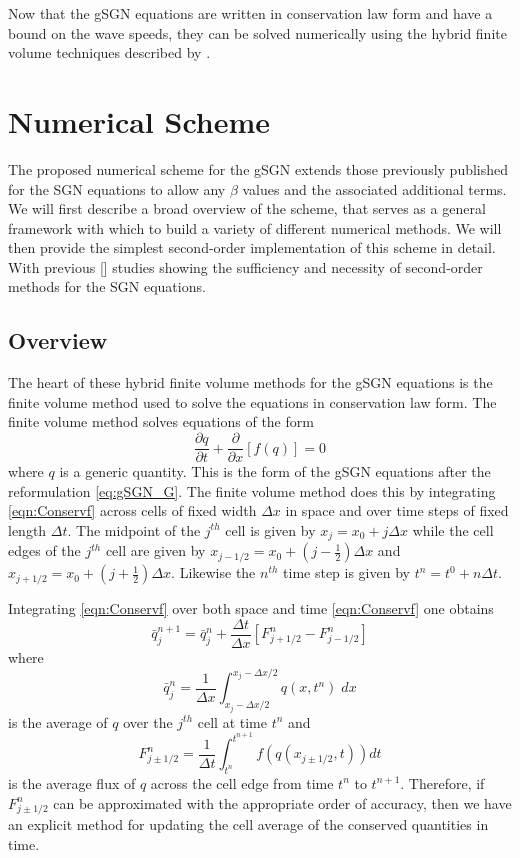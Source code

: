 \documentclass[10pt]{elsarticle}
\begin{document}
Now that the gSGN equations are written in conservation law form and have a bound on the wave speeds, they can be solved numerically using the hybrid finite volume techniques described by \citet{Zoppou-etal-2017}.

\section{Numerical Scheme}
The proposed numerical scheme for the gSGN extends those previously published for the SGN equations \cite{Hank-etal-2010-2034,Zoppou-etal-2017} to allow any $\beta$ values and the associated additional terms. We will first describe a broad overview of the scheme, that serves as a general framework with which to build a variety of different numerical methods. We will then provide the simplest second-order implementation of this scheme in detail. With previous [] studies showing the sufficiency and necessity of second-order methods for the SGN equations. 


\subsection{Overview}
The heart of these hybrid finite volume methods for the gSGN equations is the finite volume method used to solve the equations in conservation law form. The finite volume method solves equations of the form 
\begin{equation}
\label{eqn:Conservf}
\frac{\partial q}{\partial t} + \frac{\partial}{\partial x}\left[f(q)\right] = 0
\end{equation}
where $q$ is a generic quantity. This is the form of the gSGN equations after the reformulation \eqref{eq:gSGN_G}. The finite volume method does this by integrating \eqref{eqn:Conservf} across cells of fixed width $\Delta x$ in space and over time steps of fixed length $\Delta t$.  The midpoint of the $j^{th}$ cell is given by $x_j = x_0 + j \Delta x$ while the cell edges of the $j^{th}$ cell are given by $x_{j-1/2} = x_0 + (j - \frac{1}{2}) \Delta x$ and $x_{j+1/2} = x_0 + (j + \frac{1}{2}) \Delta x$. Likewise the $n^{th}$ time step is given by $t^n = t^0 + n \Delta t$. 

Integrating \eqref{eqn:Conservf}  over both space and time \eqref{eqn:Conservf} one obtains
\begin{equation}
\bar{q}^{n+1}_j = \bar{q}^{n}_j  +  \dfrac{\Delta t}{\Delta x}\left[F^n_{j+1/2} - F^n_{j-1/2}\right]
\label{eqn:ConsFVM}
\end{equation}
where 
\begin{equation*}
\bar{q}^n_j = \frac{1}{\Delta x} \int_{x_j - \Delta x / 2}^{x_j - \Delta x / 2} q(x,t^n) \; dx
\end{equation*}
is the average of $q$ over the $j^{th}$ cell at time $t^n$ and   
\begin{equation*}
F^n_{j\pm 1/2} =\frac{1}{\Delta t} \int_{t^n}^{t^{n+1}} f(q(x_{j\pm 1/2},t)) dt
\end{equation*}
is the average flux of $q$ across the cell edge from time $t^n$ to $t^{n+1}$. Therefore, if $F^n_{j\pm 1/2}$ can be approximated with the appropriate order of accuracy, then we have an explicit method for updating the cell average of the conserved quantities in time. 
\end{document}
